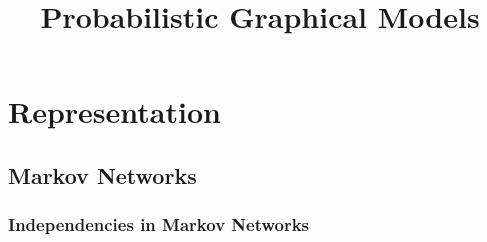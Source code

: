 \documentclass[a4paper,10pt]{article}
\title{Probabilistic Graphical Models}
\author{}
\begin{document}
\maketitle

\section{Representation}

\subsection{Markov Networks}

\subsubsection{Independencies in Markov Networks}


\end{document}

